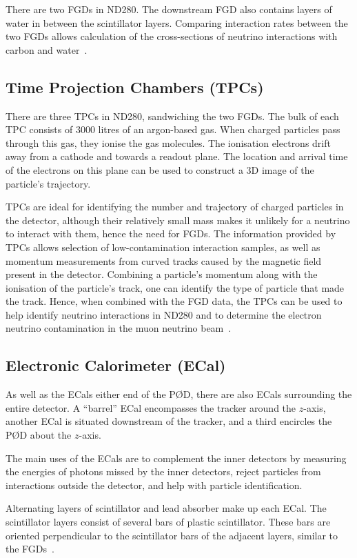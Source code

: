 \documentclass[aps,pra,12pt,notitlepage,tightenlines]{revtex4-1}
\begin{document}
There are two FGDs in ND280. The downstream FGD also contains layers of water in between the scintillator layers. Comparing interaction rates between the two FGDs allows calculation of the cross-sections of neutrino interactions with carbon and water~\cite{ABE2011106, Amaudruz:2012agx}.

\subsection{Time Projection Chambers (TPCs)}
There are three TPCs in ND280, sandwiching the two FGDs. The bulk of each TPC consists of 3000 litres of an argon-based gas. When charged particles pass through this gas, they ionise the gas molecules. The ionisation electrons drift away from a cathode and towards a readout plane. The location and arrival time of the electrons on this plane can be used to construct a 3D image of the particle's trajectory.

TPCs are ideal for identifying the number and trajectory of charged particles in the detector, although their relatively small mass makes it unlikely for a neutrino to interact with them, hence the need for FGDs. The information provided by TPCs allows selection of low-contamination interaction samples, as well as momentum measurements from curved tracks caused by the magnetic field present in the detector. Combining a particle's momentum along with the ionisation of the particle's track, one can identify the type of particle that made the track. Hence, when combined with the FGD data, the TPCs can be used to help identify neutrino interactions in ND280 and to determine the electron neutrino contamination in the muon neutrino beam~\cite{ABE2011106, Abgrall:2010hi}.

\subsection{Electronic Calorimeter (ECal)}
As well as the ECals either end of the P\O D, there are also ECals surrounding the entire detector. A ``barrel'' ECal encompasses the tracker around the $z$-axis, another ECal is situated downstream of the tracker, and a third encircles the P\O D about the $z$-axis. 

The main uses of the ECals are to complement the inner detectors by measuring the energies of photons missed by the inner detectors, reject particles from interactions outside the detector, and help with particle identification.

Alternating layers of scintillator and lead absorber make up each ECal. The scintillator layers consist of several bars of plastic scintillator. These bars are oriented perpendicular to the scintillator bars of the adjacent layers, similar to the FGDs~\cite{ABE2011106}.
\end{document}
